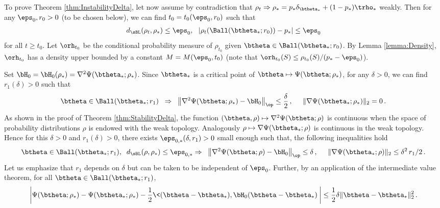\documentclass[11pt]{article}
\begin{document}
To prove Theorem \ref{thm:InstabilityDelta}, let now assume by contradiction that $\rho_t\Rightarrow \rho_*= p_*\delta_{\btheta_*} +(1-p_*)\trho_*$ weakly. Then for any $\eps_0, r_0>0$ (to be chosen below),
we can find $t_0= t_0(\eps_0, r_0)$ such that 
\begin{align}\label{eqn:ApproxDistance}
d_{\sBL}(\rho_t,\rho_*)\le \eps_0, ~~ |\rho_t(\Ball(\btheta_*;r_0))-p_*|\le \eps_0
\end{align}
for all $t\ge t_0$. 
Let $\orh_{t_0}$ be the conditional probability measure of $\rho_{t_0}$ given $\btheta\in \Ball(\btheta_*;r_0)$.
By Lemma \ref{lemma:Density}, $\orh_{t_0}$ has a density upper bounded by  a constant $M= M(\eps_0, t_0)$
(note that $\orh_{t_0}(S)\le \rho_{t_0}(S)/(p_*-\eps_0)$).

Set $\bH_0 = \bH_0(\rho_*) = \nabla^2\Psi(\btheta_*;\rho_*)$.
Since $\btheta_*$ is a critical point of $\btheta\mapsto \Psi(\btheta;\rho_*)$, for any $\delta>0$, we can find $r_1(\delta)>0$ such that
%
\begin{align}
%
\btheta\in\Ball(\btheta_*;r_1)\;\;\Rightarrow \;\;\big\|\nabla^2\Psi(\btheta;\rho_*)-\bH_0\big\|_{\op}\le\frac{\delta}{2}\, ,\;\;\;\;\;
\|\nabla\Psi(\btheta_*;\rho_*)\|_2 =0\, .
%
\end{align}
%
As shown in the proof of Theorem \ref{thm:StabilityDelta}, the function $(\btheta,\rho)\mapsto \nabla^2\Psi(\btheta;\rho)$ is continuous when the space
of probability distributions $\rho$ is endowed with the weak topology.
Analogously $\rho\mapsto \nabla\Psi(\btheta_*;\rho)$ is continuous in the weak topology. Hence for this $\delta>0$ and
 $r_1(\delta)>0$, there exists  $\eps_{0,*}(\delta, r_1)>0$ small enough such that, the following inequalities hold
%
\begin{align}
%
\btheta\in\Ball(\btheta_*;r_1),\;\;d_{\sBL}(\rho,\rho_*)\le \eps_{0, *} \Rightarrow \;\;\big\|\nabla^2\Psi(\btheta;\rho)-\bH_0\big\|_{\op}\le\delta\, ,\;\;\;\;\;
\|\nabla\Psi(\btheta_*;\rho)\|_2\le \delta^2\, r_1/2 \, .
\label{eq:ApproxHessian}
%
\end{align}
%
Let us emphasize that $r_1$ depends on $\delta$ but can be taken to be independent of $\eps_0$. Further,
by an application of the intermediate value theorem, for all  $\btheta\in\Ball(\btheta_*;r_1)$,
%
\begin{align}
%
\left|\Psi(\btheta;\rho_*)-\Psi(\btheta_*;\rho_*)-\frac{1}{2}\<(\btheta-\btheta_*),\bH_0 (\btheta-\btheta_*)\>\right|\le \frac{1}{2}\delta \|\btheta-\btheta_*\|_2^2\, .
\label{eq:ApproxValue}
%
\end{align}
%
\end{document}
